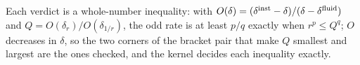\documentclass[11pt]{article}
\begin{document}
Each verdict is a whole-number inequality: with $O(\delta)=(\delta^{\rm inst}-\delta)/(\delta-\delta^{\rm fluid})$ and $Q=O(\delta_r)/O(\delta_{1/r})$, the odd rate is at least $p/q$ exactly when $r^p\le Q^q$; $O$ decreases in $\delta$, so the two corners of the bracket pair that make $Q$ smallest and largest are the ones checked, and the kernel decides each inequality exactly.



\end{document}
